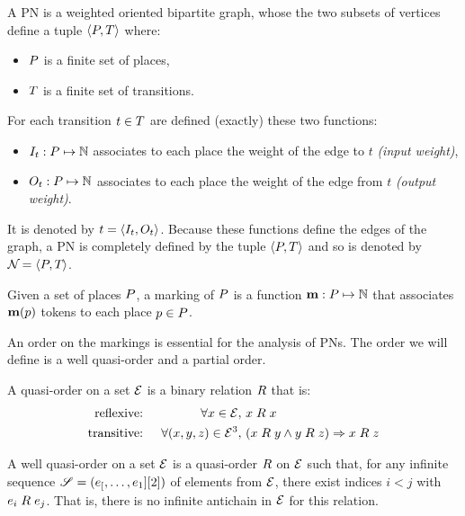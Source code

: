 \begin{defi}[\acl{PN}]
  A \acf{PN} \namePN is a weighted oriented bipartite graph, whose the two subsets of vertices define a tuple $\left\langle P, T\right\rangle$ where:
  \begin{itemize}
    \item $P$ is a finite set of places,
    \item $T$ is a finite set of transitions.
  \end{itemize}
  For each transition $t \in T$ are defined (exactly) these two functions:
  \begin{itemize}
    \item $\inw[t] : \places \mapsto \naturals$ associates to each place the weight of the edge to $t$ \emph{(input weight)},
    \item $\outw[t] : \places \mapsto \naturals$ associates to each place the weight of the edge from $t$ \emph{(output weight)}.
  \end{itemize}
  It is denoted by $t = \tuple{\inw[t], \outw[t]}$.
  Because these functions define the edges of the graph, a \ac{PN} is completely defined by the tuple $\left\langle P, T\right\rangle$ and so is denoted by $\mathcal{N}_{} = \left\langle P_{}, T_{}\right\rangle$.
\end{defi}

\begin{defi}[marking]
  Given a set of places $P$, a marking of $P$ is a function $\mathbf{m} : P \mapsto \mathbb{N}$ that associates $\mathbf{m}(p)$ tokens to each place $p \in P$.
\end{defi}

An order on the markings is essential for the analysis of \acp{PN}.
The order we will define is a well quasi-order and a partial order.

\begin{defi}
  A quasi-order on a set $\mathcal{E}$ is a binary relation $\mathrel{R}$ that is:
  \begin{align*}
    \text{reflexive: }  &&\forall x \in \mathcal{E},\ & x \mathrel{R} x \\
    \text{transitive: } &&\forall (x, y, z) \in \mathcal{E}^3,\ & (x \mathrel{R} y\land y \mathrel{R} z)\Rightarrow x \mathrel{R} z
  \end{align*}
\end{defi}

\begin{defi}
  A well quasi-order on a set $\mathcal{E}$ is a quasi-order $\mathrel{R}$ on $\mathcal{E}$ such that, for any infinite sequence $\defInfSeq$ of elements from $\mathcal{E}$, there exist indices $i < j$ with $e_i \mathrel{R} e_j$. That is, there is no infinite antichain in $\mathcal{E}$ for this relation.
\end{defi}


